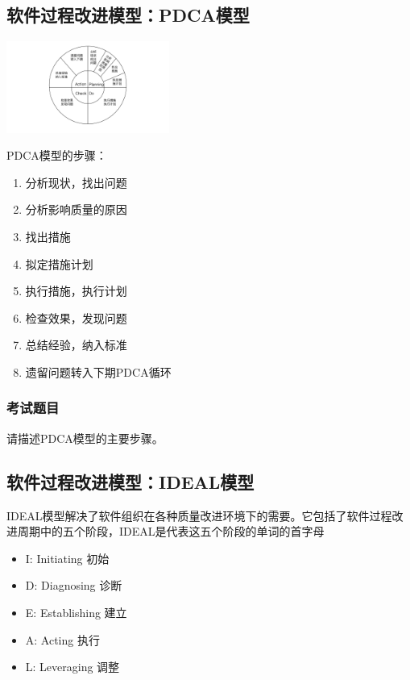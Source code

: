 \subsection{软件过程改进模型：PDCA模型}
\begin{table}
    \vspace{-4.5em}
	\centering
	\includegraphics[width=0.4\textwidth]{images/PDCA.pdf}
    \vspace{-1em}
\end{table}
PDCA模型的步骤：
\vspace{-0.8em}
\begin{multicols}{2}
    \begin{enumerate}[label=\arabic*.]
        \item 分析现状，找出问题
        \item 分析影响质量的原因
        \item 找出措施
        \item 拟定措施计划
        \item 执行措施，执行计划
        \item 检查效果，发现问题
        \item 总结经验，纳入标准
        \item 遗留问题转入下期PDCA循环
    \end{enumerate}
\end{multicols}
\vspace{-1em}

\subsubsection{考试题目}
\begin{problem}
请描述PDCA模型的主要步骤。
\end{problem}


\subsection{软件过程改进模型：IDEAL模型}
IDEAL模型解决了软件组织在各种质量改进环境下的需要。它包括了软件过程改进周期中的五个阶段，IDEAL是代表这五个阶段的单词的首字母
\vspace{-0.8em}
\begin{multicols}{3}
    \begin{itemize}
        \item I: Initiating 初始
        \item D: Diagnosing 诊断
        \item E: Establishing 建立
        \item A: Acting 执行
        \item L: Leveraging 调整
    \end{itemize}
\end{multicols}
\vspace{-1em}

